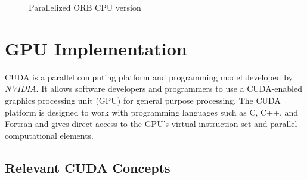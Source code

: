 \documentclass[]{article}
\begin{document}
\begin{figure}[H]
	\begin{center}
	\end{center}
	\caption{Parallelized ORB CPU version}
	\label{fig:orbp}
\end{figure}

\newpage
\section{GPU Implementation}\label{sec:gpuimpl}

CUDA is a parallel computing platform and programming model developed by \textit{NVIDIA}. It allows software developers and programmers to use a CUDA-enabled graphics processing unit (GPU) for general purpose processing.
The CUDA platform is designed to work with programming languages such as C, C++, and Fortran and gives direct access to the GPU's virtual instruction set and parallel computational elements.

\subsection{Relevant CUDA Concepts}
\end{document}
